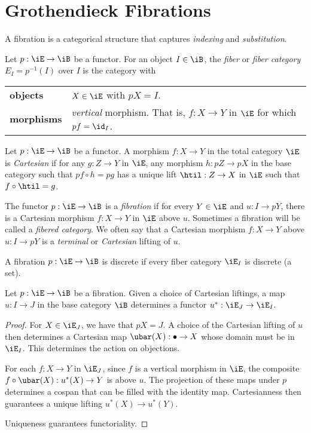 \documentclass{amsart}
\begin{document}
\section{Grothendieck Fibrations}
A fibration is a categorical structure that captures \emph{indexing} and \emph{substitution}.

\begin{defn}
  Let $p : \iE \to \iB$ be a functor.
  For an object $I \in \iB$, the \emph{fiber} or \emph{fiber category} $E_{I} = p^{-1}(I)$ over $I$ is the category with
  \begin{center}
    \begin{tabular}{ll}
      \textbf{objects} & $X \in \iE$ with $pX = I$.\\
      \textbf{morphisms} & \emph{vertical} morphism.
                           That is, $f : X \to Y$ in $\iE$ for which $pf = \id_{I}$.
    \end{tabular}
  \end{center}
\end{defn}

\begin{defn}
  Let $p : \iE \to \iB$ be a functor.
  A morphism $f : X \to Y$ in the total category $\iE$ is \emph{Cartesian} if for any $g : Z \to Y$ in $\iE$, any morphism $h : pZ \to pX$ in the base category such that $pf \circ h = pg$ has a unique lift $\htil : Z \to X$ in $\iE$ such that $f \circ \htil = g$.
  
\end{defn}

\begin{defn}[Fibration]
  The functor $p : \iE \to \iB$ is a \emph{fibration} if for every $Y \in \iE$ and $u : I \to pY$, there is a Cartesian morphism $f : X \to Y$ in $\iE$ above $u$.
  Sometimes a fibration will be called a \emph{fibered category}.
  We often say that a Cartesian morphism $f : X \to Y$ above $u : I \to pY$ is a \emph{terminal} or \emph{Cartesian} lifting of $u$.
\end{defn}
A fibration $p : \iE \to \iB$ is discrete if every fiber category $\iE_{I}$ is discrete (a set).

\begin{thm}
  Let $p : \iE \to \iB$ be a fibration.
  Given a choice of Cartesian liftings, a map $u : I \to J$ in the base category $\iB$ determines a functor $u^{*} : \iE_{J} \to \iE_{I}$.
\end{thm}
\begin{proof}
  For $X \in \iE_{J}$, we have that $pX = J$.
  A choice of the Cartesian lifting of $u$ then determines a Cartesian map $\ubar(X) : \bullet \to X$ whose domain must be in $\iE_{I}$. This determines the action on objections.

  For each $f : X \to Y$ in $\iE_{J}$, since $f$ is a vertical morphism in $\iE$, the composite $f \circ \ubar(X) : u^{*}(X) \to Y$ is above $u$.
  The projection of these maps under $p$ determines a cospan that can be filled with the identity map.
  Cartesianness then guarantees a unique lifting $u^{*}(X) \to u^{*}(Y)$.
  

  Uniqueness guarantees functoriality.
\end{proof}
\end{document}
